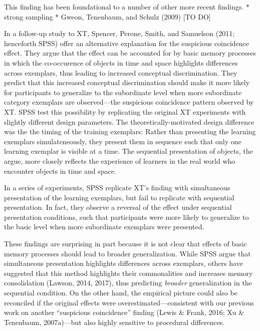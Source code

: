 \documentclass[english,floatsintext,man]{apa6}
\theoremstyle{definition}
\theoremstyle{definition}
\theoremstyle{remark}
\begin{document}
This finding has been foundational to a number of other more recent
findings. * strong sampling * Gweon, Tenenbaum, and Schulz (2009) {[}TO
DO{]}

In a follow-up study to XT, Spencer, Perone, Smith, and Samuelson (2011;
henceforth SPSS) offer an alternative explanation for the suspicious
coincidence effect. They argue that the effect can be accounted for by
basic memory processes in which the co-occurence of objects in time and
space highlights differences across exemplars, thus leading to increased
conceptual discrimination. They predict that this increased conceptual
discrimination should make it more likely for participants to generalize
to the subordinate level when more subordinate category exemplars are
observed---the suspicious coincidence pattern observed by XT. SPSS test
this possibility by replicating the original XT experiments with
slightly different design parameters. The theoretically-motivated design
difference was the the timing of the training exemplars: Rather than
presenting the learning exemplars simulateneously, they present them in
sequence such that only one learning exemplar is visible at a time. The
sequential presentation of objects, the argue, more closely reflects the
experience of learners in the real world who encounter objects in time
and space.

In a series of experiments, SPSS replicate XT's finding with
simultaneous presentation of the learning exemplars, but fail to
replicate with sequential presentation. In fact, they observe a reversal
of the effect under sequential presentation conditions, such that
participants were more likely to generalize to the basic level when more
subordinate exemplars were presented.

These findings are surprising in part because it is not clear that
effects of basic memory processes should lead to broader generalization.
While SPSS argue that simultaneous presentation highlights differences
across exemplars, others have suggested that this method highlights
their commonalities and increases memory consolidation (Lawson, 2014,
2017), thus predicting \emph{broader} generalization in the sequential
condition. On the other hand, the empirical picture could also be
reconciled if the original effects were overestimated---consistent with
our previous work on another \enquote{suspicious coincidence} finding
(Lewis \& Frank, 2016; Xu \& Tenenbaum, 2007a)---but also highly
sensitive to procedural differences.
\end{document}
